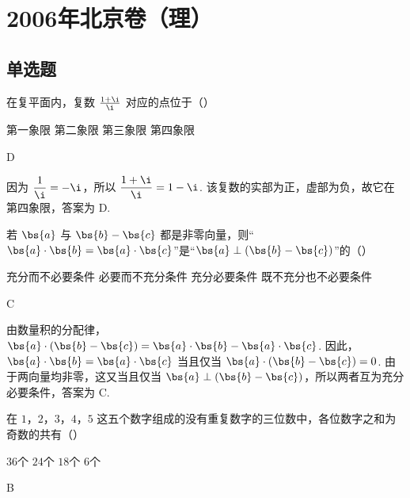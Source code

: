 \chapter{2006年北京卷（理）}
\section{单选题}
\begin{problem}
在复平面内，复数 \(\frac{1+\i}{\i}\) 对应的点位于（\quad）

\choices
    {第一象限}
    {第二象限}
    {第三象限}
    {第四象限}
\end{problem}

\begin{answer}
D
\end{answer}

\begin{solution}
因为 \(\dfrac{1}{\i}=-\i\)，所以 \(\dfrac{1+\i}{\i}=1-\i\).
该复数的实部为正，虚部为负，故它在第四象限，答案为 D.
\end{solution}

\begin{problem}
若 \(\bs{a}\) 与 \(\bs{b}-\bs{c}\) 都是非零向量，则“\(\bs{a}\cdot\bs{b}=\bs{a}\cdot\bs{c}\)”是“\(\bs{a}\perp(\bs{b}-\bs{c})\)”的（\quad）

\choices
    {充分而不必要条件}
    {必要而不充分条件}
    {充分必要条件}
    {既不充分也不必要条件}
\end{problem}

\begin{answer}
C
\end{answer}

\begin{solution}
由数量积的分配律，\(\bs{a}\cdot(\bs{b}-\bs{c})=\bs{a}\cdot\bs{b}-\bs{a}\cdot\bs{c}\).
因此，\(\bs{a}\cdot\bs{b}=\bs{a}\cdot\bs{c}\) 当且仅当 \(\bs{a}\cdot(\bs{b}-\bs{c})=0\). 由于两向量均非零，这又当且仅当 \(\bs{a}\perp(\bs{b}-\bs{c})\)，所以两者互为充分必要条件，答案为 C.
\end{solution}

\begin{problem}
在 \(1\)，\(2\)，\(3\)，\(4\)，\(5\) 这五个数字组成的没有重复数字的三位数中，各位数字之和为奇数的共有（\quad）

\choices
    {\(36\)个}
    {\(24\)个}
    {\(18\)个}
    {\(6\)个}
\end{problem}

\begin{answer}
B
\end{answer}

